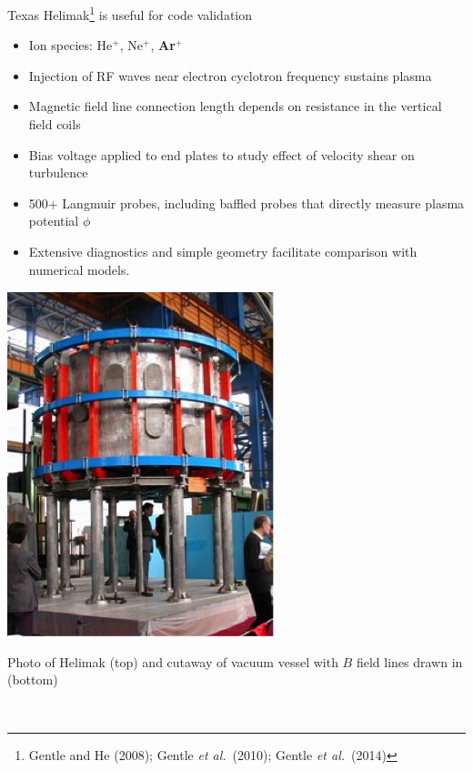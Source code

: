 \documentclass[12pt,table]{beamer}
\newcommand{\etal}{\emph{et al.}}
\begin{document}
\begin{frame}{Texas Helimak\footnote{\scriptsize Gentle and He (2008); Gentle \etal\ (2010); Gentle \etal\ (2014)} is useful for code validation}
    \begin{minipage}{0.55\linewidth}
        \begin{itemize} \footnotesize
        \item Ion species: He$^+$, Ne$^+$, {\bf Ar$^+$}
        \item Injection of RF waves near electron cyclotron frequency sustains plasma
        \item Magnetic field line connection length depends on resistance in the vertical field coils
        \item Bias voltage applied to end plates to study effect of velocity shear on turbulence
        \item 500+ Langmuir probes, including baffled probes that directly measure plasma potential $\phi$
        \item Extensive diagnostics and simple geometry facilitate comparison with numerical models.
        \end{itemize}
    \end{minipage}%
    \hfill
    \begin{minipage}{0.45\linewidth}
        \centering
        \includegraphics[width=.5\linewidth]{figs/heli-photo.png} \\
        \smallskip
        \begin{minipage}{.6\linewidth}
        \centering
            \tiny Photo of Helimak (top) and cutaway of vacuum vessel with $B$ field lines drawn in (bottom)
        \end{minipage} \\

\end{minipage}
\end{frame}
\end{document}
